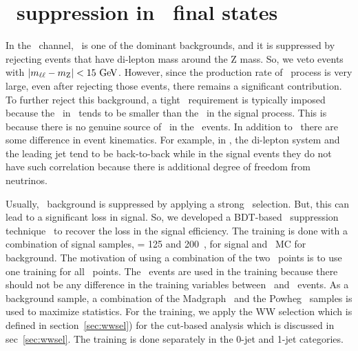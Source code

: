 \section{\dyll\ suppression in \SF\ final states} 
\label{sec:dybkg}

In the \SF\ channel, \dyll\ is one of the dominant backgrounds, 
and it is suppressed by rejecting events that have 
di-lepton mass around the Z mass. So, we veto events with 
$\left|m_{\ell\ell} - m_{\mathrm{Z}} \right| < 15~\mathrm{Ge\kern -0.1em V}$. However, since the 
production rate of \dyll\ process is very large, even after
rejecting those events, there remains a significant contribution. 
To further reject this background, a tight \met\ requirement is typically imposed
because the \met\ in \dyll\ tends to be smaller than 
the \met\ in the signal process. 
This is because there is no genuine source of \met\ in the \dyll\ events. 
In addition to \met\ there are some difference in event kinematics.
For example, in \dyll, the di-lepton system and the leading jet tend 
to be back-to-back while in the signal events they do not have such 
correlation because there is additional degree of freedom from neutrinos.   

Usually, \dyll\ background is suppressed by applying a strong \met\ selection. 
But, this can lead to a significant loss in signal. 
So, we developed a BDT-based \dyll\ suppression technique~\cite{dymva} to recover the 
loss in the signal efficiency. 
The training is done with a combination of signal samples, \mHi = 125 and 200~\GeV, 
for signal and \dyll\ MC for background. The motivation of using a combination of the two 
\mHi\ points is to use one training for all \mHi\ points. The \DF\ events 
are used in the training because there should not be any difference in the training 
variables between \SF\ and \DF\ events. 
As a background sample, 
a combination of the Madgraph~\cite{Madgraph5p1} and the Powheg~\cite{Frixione:2007vw} 
samples is used to maximize statistics. 
For the training, we apply the WW selection which is defined in section~\ref{sec:wwsel}) 
for the cut-based analysis
which is discussed in sec~\ref{sec:wwsel}.
The training is done separately in the 0-jet and 1-jet categories. 

